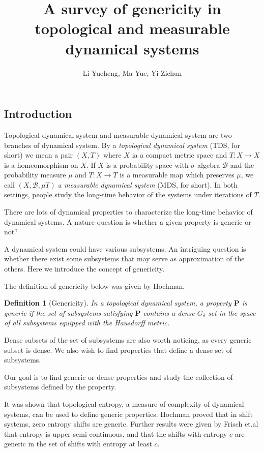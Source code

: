 \documentclass{article}
\newtheorem{definition}{Definition}
\begin{document}
\begin{CJK}{UTF8}{gbsn}

\title{A survey of genericity in topological and measurable dynamical systems}
\author{Li Yueheng, Ma Yue, Yi Zichun}
\maketitle

\section{Introduction}
Topological dynamical system and measurable dynamical system are two branches of dynamical system. By a {\it topological dynamical system} (TDS, for short) we mean a pair $(X,T)$ where $X$ ia a compact metric space and $T:X\rightarrow X$ is a homeomorphism on $X$. If $X$ is a probability space with $\sigma$-algebra $\mathcal B$ and the probability measure $\mu$ and $T:X\rightarrow T$ is a measurable map which preserves $\mu$, we call $(X,\mathcal B,\mu T)$ a {\it measurable dynamical system} (MDS, for short). In both settings, people study the long-time behavior of the systems under iterations of $T$.

There are lots of dynamical properties to characterize the long-time behavior of dynamical systems. A nature question is whether a given property is 
generic or not?

A dynamical system could have various subsystems. An intriguing question is whether there exist some subsystems that may serve as approximation of the others. Here we introduce the concept of genericity.

The definition of genericity below was given by Hochman\cite{Hochman}.


\begin{definition}[Genericity]
	In a topological dynamical system, a property $\textbf{P}$ is generic if the set of subsystems satisfying $\textbf{P}$ contains a dense $G_\delta$ set in the space of all subsystems equipped with the Hausdorff metric.
\end{definition}

Dense subsets of the set of subsystems are also worth noticing, as every generic subset is dense. We also wish to find properties that define a dense set of subsystems.

Our goal is to find generic or dense properties and study the collection of subsystems defined by the property.

It was shown that topological entropy, a measure of complexity of dynamical systems, can be used to define generic properties. Hochman\cite{Hochman} proved that in shift systems, zero entropy shifts are generic. Further results were given by Frisch et.al\cite{Frisch} that entropy is upper semi-continuous, and that the shifts with entropy $c$ are generic in the set of shifts with entropy at least $c$.



\end{CJK}
\end{document}
